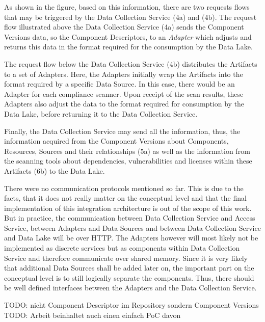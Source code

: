As shown in the figure, based on this information, there are two requests flows that may be triggered by the Data Collection Service (4a) and (4b). The request flow illustrated above the Data Collection Service (4a) sends the Component Versions data, so the Component Descriptors, to an \emph{Adapter} which adjusts and returns this data in the format required for the consumption by the Data Lake.\par 
The request flow below the Data Collection Service (4b) distributes the Artifacts to a set of Adapters. Here, the Adapters initially wrap the Artifacts into the format required by a specific Data Source. In this case, there would be an Adapter for each compliance scanner. Upon receipt of the scan results, these Adapters also adjust the data to the format required for consumption by the Data Lake, before returning it to the Data Collection Service.\par 
Finally, the Data Collection Service may send all the information, thus, the information acquired from the Component Versions about Components, Resources, Sources and their relationships (5a) as well as the information from the scanning tools about dependencies, vulnerabilities and licenses within these Artifacts (6b) to the Data Lake.\par
There were no communication protocols mentioned so far. This is due to the facts, that it does not really matter on the conceptual level and that the final implementation of this integration architecture is out of the scope of this work. But in practice, the communication between Data Collection Service and Access Service, between Adapters and Data Sources and between Data Collection Service and Data Lake will be over HTTP. The Adapters however will most likely not be implemented as discrete services but as components within Data Collection Service and therefore communicate over shared memory. Since it is very likely that additional Data Sources shall be added later on, the important part on the conceptual level is to still logically separate the components. Thus, there should be well defined interfaces between the Adapters and the Data Collection Service.

TODO: nicht Component Descriptor im Repository sondern Component Versions
TODO: Arbeit beinhaltet auch einen einfach PoC davon




